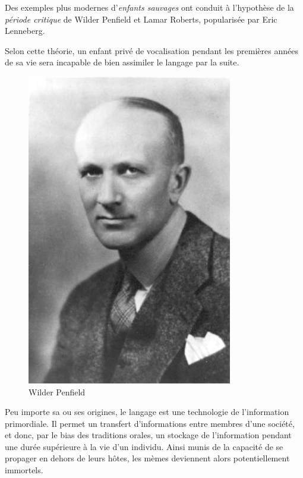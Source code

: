 \begin{minipage}[H]{0.65\linewidth}
Des exemples plus modernes d'\emph{enfants sauvages} ont conduit à l'hypothèse de la \emph{période critique} de Wilder Penfield et Lamar Roberts\cite{penfield2003speech}, popularisée par Eric Lenneberg\cite{lenneberg-crit-period}.

Selon cette théorie, un enfant privé de vocalisation pendant les premières années de sa vie sera incapable de bien assimiler le langage par la suite.

\end{minipage}
\begin{minipage}[H]{0.34\linewidth}
  \begin{figure}[H]
  \centering
  \includegraphics[width=0.8\textwidth]{../resources/illustrations/penfield}
  \caption{Wilder Penfield}
  \end{figure}
\end{minipage}

Peu importe sa ou ses origines, le langage est une technologie de l'information primordiale. Il permet un transfert d'informations entre membres d'une société, et donc, par le bias des traditions orales, un stockage de l'information pendant une durée supérieure à la vie d'un individu. Ainsi munis de la capacité de se propager en dehors de leurs hôtes, les mèmes deviennent alors potentiellement immortels.

